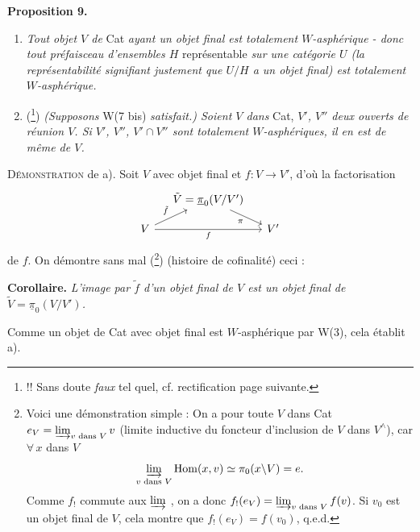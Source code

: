 \documentclass[11pt]{article}
\newcommand{\printedpage}[1]{\marginpar{\footnotesize p.~#1}}
\newcommand{\upi}{\underline{\pi}}
\newcommand{\Hom}{\operatorname{Hom}}
\begin{document}
\setcounter{footnote}{65}

\printedpage{68}

\noindent\textbf{Proposition 9.}

\begin{enumerate}[label=\textit{\alph*)}]
\item \textit{Tout objet $V$ de} Cat \textit{ayant un objet final est totalement $W$-asphérique - donc tout préfaisceau d'ensembles $H$} représentable \textit{sur une catégorie $U$ (la représentabilité signifiant justement que $U/H$ a un objet final) est totalement $W$-asphérique.}

\item (\footnote{!! Sans doute \textit{faux} tel quel, cf. rectification page suivante.}) \textit{(Supposons} W(7 bis) \textit{satisfait.) Soient $V$ dans} Cat, \textit{$V'$, $V''$ deux ouverts de réunion $V$. Si $V'$, $V''$, $V'\cap V''$ sont totalement $W$-asphériques, il en est de même de $V$.}
\end{enumerate}

\noindent\textsc{Démonstration} de a). Soit $V$ avec objet final et $f : V \longrightarrow V'$, d'où la factorisation
\[
\begin{tikzcd}[column sep=small, row sep=small]
 & \tilde{V} = \upi_0(V/V') \arrow[dr, "\pi"'] & \\
V \arrow[ur, "\tilde{f}"] \arrow[rr, "f"'] & & V'
\end{tikzcd}
\]
de $f$. On démontre sans mal (\footnote{Voici une démonstration simple : On a pour toute $V$ dans Cat $e_V = \varinjlim_{v \text{ dans } V} v$ (limite inductive du foncteur d'inclusion de $V$ dans $V^\wedge$), car $\forall\, x$ dans $V$
\[
\varinjlim_{v \text{ dans } V} \Hom(x,v) \simeq \pi_0(x\backslash V) = e.
\]
Comme $f_!$ commute aux $\varinjlim$ , on a donc $f_!(e_V) = \varinjlim_{v \text{ dans } V} f(v)$. Si $v_0$ est un objet final de $V$, cela montre que $f_!(e_V) = f(v_0)$, q.e.d.}) (histoire de cofinalité) ceci :

\noindent\textbf{Corollaire.} \textit{L'image par $\tilde{f}$ d'un objet final de $V$ est un objet final de $\tilde{V} = \upi_0(V/V')$.}

Comme un objet de Cat avec objet final est $W$-asphérique par W(3), cela établit a).
\end{document}
